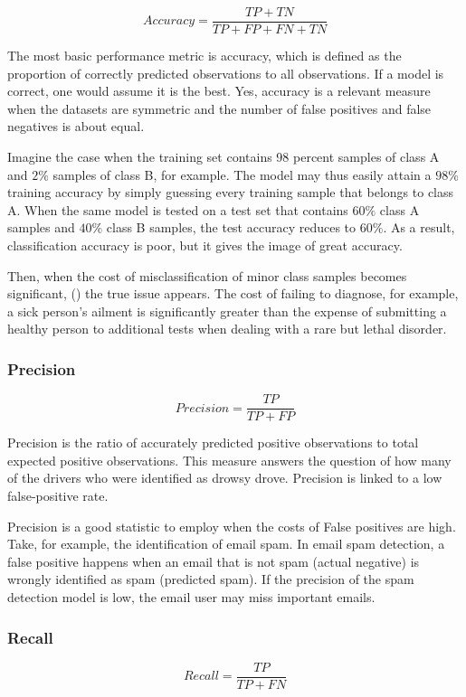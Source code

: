 \begin{equation}
    Accuracy = \frac{TP+TN}{TP+FP+FN+TN}
\end{equation}

The most basic performance metric is accuracy, which is defined as the proportion of correctly predicted observations to all observations. If a model is correct, one would assume it is the best. Yes, accuracy is a relevant measure when the datasets are symmetric and the number of false positives and false negatives is about equal.

Imagine the case when the training set contains 98 percent samples of class A and $2\%$ samples of class B, for example. The model may thus easily attain a $98\%$ training accuracy by simply guessing every training sample that belongs to class A. When the same model is tested on a test set that contains $60\%$ class A samples and $40\%$ class B samples, the test accuracy reduces to $60\%$. As a result, classification accuracy is poor, but it gives the image of great accuracy.

Then, when the cost of misclassification of minor class samples becomes significant, (\cite{metrics1}) the true issue appears. The cost of failing to diagnose, for example, a sick person's ailment is significantly greater than the expense of submitting a healthy person to additional tests when dealing with a rare but lethal disorder.

\subsubsection{Precision} \label{4precision}
\begin{equation}
    Precision = \frac{TP}{TP+FP}
\end{equation}

Precision \cite{metrics2} is the ratio of accurately predicted positive observations to total expected positive observations. This measure answers the question of how many of the drivers who were identified as drowsy drove. Precision is linked to a low false-positive rate.

Precision is a good statistic to employ when the costs of False positives are high. Take, for example, the identification of email spam. In email spam detection, a false positive happens when an email that is not spam (actual negative) is wrongly identified as spam (predicted spam). If the precision of the spam detection model is low, the email user may miss important emails.

\subsubsection{Recall} \label{4recall}
\begin{equation}
    Recall = \frac{TP}{TP+FN}
\end{equation}

